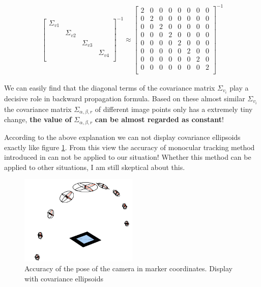 \begin{align*}
                \begin{bmatrix} 
                  \Sigma_{v1} & \quad & \quad & \quad\\ 
                  \quad & \Sigma_{v2} & \quad & \quad\\ 
                  \quad & \quad & \Sigma_{v3} & \quad\\ 
                  \quad & \quad & \quad & \Sigma_{v4}\\ 
                \end{bmatrix}^{-1} 
                \approx
                \begin{bmatrix} 
                  2 & 0 & 0 & 0 & 0 & 0 & 0 & 0 \\
                  0 & 2 & 0 & 0 & 0 & 0 & 0 & 0 \\
                  0 & 0 & 2 & 0 & 0 & 0 & 0 & 0 \\
                  0 & 0 & 0 & 2 & 0 & 0 & 0 & 0 \\
                  0 & 0 & 0 & 0 & 2 & 0 & 0 & 0 \\
                  0 & 0 & 0 & 0 & 0 & 2 & 0 & 0 \\
                  0 & 0 & 0 & 0 & 0 & 0 & 2 & 0 \\
                  0 & 0 & 0 & 0 & 0 & 0 & 0 & 2 \\                  
                \end{bmatrix}^{-1} 
\end{align*}

We can easily find that the diagonal terms of the covariance matrix $\Sigma_{v_i}$ play a decisive role in backward propagation formula. Based on these almost similar $\Sigma_{v_i}$ the covariance matrix $\Sigma_{\alpha,\beta,r}$ of different image points only has a extremely tiny change, \textbf{the value of} $\Sigma_{\alpha,\beta,r}$ \textbf{can be almost regarded as constant}! 

According to the above explanation we can not display covariance ellipsoids exactly like figure \ref{fig:cov_ellip}. From this view the accuracy of monocular tracking method introduced in \cite{bauer2007tracking}
can not be applied to our situation! Whether this method can be applied to other situations, I am still skeptical about this.

\begin{figure}[h!]
\centering
\includegraphics[width=0.5\textwidth]{./fig/cov_ellip.png}
    \caption{Accuracy of the pose of the camera in marker coordinates. Display with covariance ellipsoids\cite{bauer2007tracking}}
\label{fig:cov_ellip}
\end{figure}
